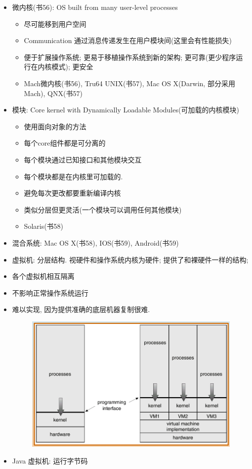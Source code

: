 \documentclass[a4paper, UTF8]{article}
\begin{document}
\begin{itemize}
\item 微内核(书56): OS built from many user-level processes
	\begin{itemize}
	\item 尽可能移到用户空间
	\item Communication 通过消息传递发生在用户模块间(这里会有性能损失)
	\item 便于扩展操作系统; 更易于移植操作系统到新的架构; 更可靠(更少程序运行在内核模式); 更安全
	\item Mach微内核(书56), Tru64 UNIX(书57), Mac OS X(Darwin, 部分采用Mach), QNX(书57)
	\end{itemize}
\item 模块: Core kernel with Dynamically Loadable Modules(可加载的内核模块)
	\begin{itemize}
	\item 使用面向对象的方法
	\item 每个core组件都是可分离的
	\item 每个模块通过已知接口和其他模块交互
	\item 每个模块都是在内核里可加载的.
	\item 避免每次更改都要重新编译内核
	\item 类似分层但更灵活(一个模块可以调用任何其他模块)
	\item Solaris(书58)
	\end{itemize}
\item 混合系统: Mac OS X(书58), IOS(书59), Android(书59)
\item 虚拟机: 分层结构. 视硬件和操作系统内核为硬件; 提供了和裸硬件一样的结构;
	\item 各个虚拟机相互隔离
	\item 不影响正常操作系统运行
	\item 难以实现, 因为提供准确的底层机器复制很难.
	\begin{figure}[H]
		\centering
		\includegraphics[width=\linewidth/2]{VM_system_models.png}
	\end{figure}\par
	\item Java 虚拟机: 运行字节码
\end{itemize}
\end{document}

